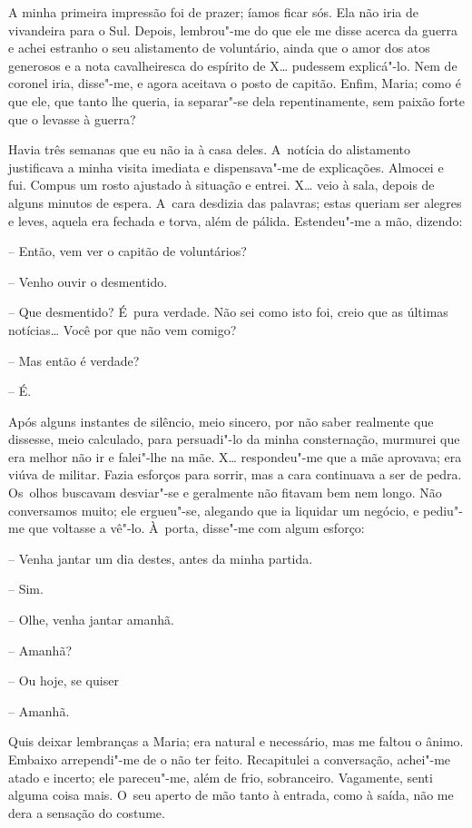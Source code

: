 A minha primeira impressão foi de prazer; íamos ficar sós. Ela não iria
de vivandeira para o Sul. Depois, lembrou"-me do que ele me disse acerca
da guerra e achei estranho o seu alistamento de voluntário, ainda que o
amor dos atos generosos e a nota cavalheiresca do espírito de X\ldots{}
pudessem explicá"-lo. Nem de coronel iria, disse"-me, e agora aceitava o
posto de capitão. Enfim, Maria; como é que ele, que tanto lhe queria, ia
separar"-se dela repentinamente, sem paixão forte que o levasse à guerra?

Havia três semanas que eu não ia à casa deles. A~notícia do alistamento
justificava a minha visita imediata e dispensava"-me de explicações.
Almocei e fui. Compus um rosto ajustado à situação e entrei. X\ldots{} veio à
sala, depois de alguns minutos de espera. A~cara desdizia das palavras;
estas queriam ser alegres e leves, aquela era fechada e torva, além de
pálida. Estendeu"-me a mão, dizendo:

-- Então, vem ver o capitão de voluntários?

-- Venho ouvir o desmentido.

-- Que desmentido? É~pura verdade. Não sei como isto foi, creio que as
últimas notícias\ldots{} Você por que não vem comigo?

-- Mas então é verdade?

-- É.

Após alguns instantes de silêncio, meio sincero, por não saber realmente
que dissesse, meio calculado, para persuadi"-lo da minha consternação,
murmurei que era melhor não ir e falei"-lhe na mãe. X\ldots{} respondeu"-me que
a mãe aprovava; era viúva de militar. Fazia esforços para sorrir, mas a
cara continuava a ser de pedra. Os~olhos buscavam desviar"-se e
geralmente não fitavam bem nem longo. Não conversamos muito; ele
ergueu"-se, alegando que ia liquidar um negócio, e pediu"-me que voltasse
a vê"-lo. À~porta, disse"-me com algum esforço:

-- Venha jantar um dia destes, antes da minha partida.

-- Sim.

-- Olhe, venha jantar amanhã.

-- Amanhã?

-- Ou hoje, se quiser

-- Amanhã.

Quis deixar lembranças a Maria; era natural e necessário, mas me faltou
o ânimo. Embaixo arrependi"-me de o não ter feito. Recapitulei a
conversação, achei"-me atado e incerto; ele pareceu"-me, além de frio,
sobranceiro. Vagamente, senti alguma coisa mais. O~seu aperto de mão
tanto à entrada, como à saída, não me dera a sensação do costume.

